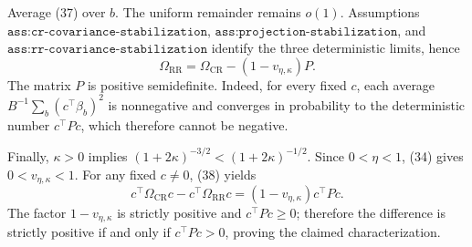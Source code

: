Average (37) over \(b\).  The uniform remainder remains \(o(1)\).  Assumptions \(\texttt{ass:cr-covariance-stabilization}\), \(\texttt{ass:projection-stabilization}\), and \(\texttt{ass:rr-covariance-stabilization}\) identify the three deterministic limits, hence
\[
 \Omega_{\mathrm{RR}}
 =\Omega_{\mathrm{CR}}-(1-v_{\eta,\kappa})P.                \tag{38}
\]
The matrix \(P\) is positive semidefinite.  Indeed, for every fixed \(c\), each average \(B^{-1}\sum_b(c^\top\beta_b)^2\) is nonnegative and converges in probability to the deterministic number \(c^\top Pc\), which therefore cannot be negative.

Finally, \(\kappa>0\) implies
\((1+2\kappa)^{-3/2}<(1+2\kappa)^{-1/2}\).  Since \(0<\eta<1\), (34) gives \(0<v_{\eta,\kappa}<1\).  For any fixed \(c\neq0\), (38) yields
\[
 c^\top\Omega_{\mathrm{CR}}c-c^\top\Omega_{\mathrm{RR}}c
 =(1-v_{\eta,\kappa})c^\top Pc.
\]
The factor \(1-v_{\eta,\kappa}\) is strictly positive and \(c^\top Pc\geq0\); therefore the difference is strictly positive if and only if \(c^\top Pc>0\), proving the claimed characterization.